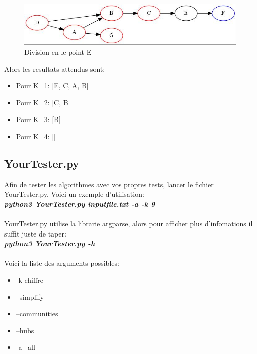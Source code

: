 \documentclass[12pt, oneside]{article}
\begin{document}
\begin{figure}[!h]
    \centering
    \includegraphics[scale=0.7,trim=3 3 3 3,clip]{artipointE}
    \caption{Division en le point E}
\end{figure}
\FloatBarrier
Alors les resultats attendus sont:
\begin{itemize}
\item Pour K=1: [E, C, A, B]
\item Pour K=2: [C, B]
\item Pour K=3: [B]
\item Pour K=4: []
\end{itemize}

\subsection{YourTester.py}
Afin de tester les algorithmes avec vos propres tests, lancer le fichier YourTester.py. Voici un exemple d'utilisation:\\
\textbf{\textit{python3 YourTester.py inputfile.txt -a -k 9}}\\\\
YourTester.py utilise la librarie argparse, alors pour afficher plus d'infomations il suffit juste de taper:\\
\textbf{\textit{python3 YourTester.py -h}}\\\\
Voici la liste des arguments possibles:
\begin{itemize}
\item -k chiffre
\item --simplify 
\item --communities
\item --hubs
\item -a --all
\end{itemize}
\end{document}
